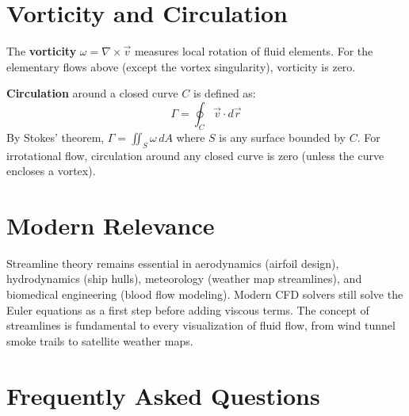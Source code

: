 \section{Vorticity and Circulation}

The \textbf{vorticity} $\omega = \nabla \times \vec{v}$ measures local rotation of fluid elements.
For the elementary flows above (except the vortex singularity), vorticity is zero.

\textbf{Circulation} around a closed curve $C$ is defined as:
\[
\Gamma = \oint_C \vec{v} \cdot d\vec{r}
\]
By Stokes' theorem, $\Gamma = \iint_S \omega \, dA$ where $S$ is any surface bounded by $C$.
For irrotational flow, circulation around any closed curve is zero (unless the curve encloses a vortex).

\section{Modern Relevance}

Streamline theory remains essential in aerodynamics (airfoil design), hydrodynamics (ship hulls),
meteorology (weather map streamlines), and biomedical engineering (blood flow modeling).
Modern CFD solvers still solve the Euler equations as a first step before adding viscous terms.
The concept of streamlines is fundamental to every visualization of fluid flow, from wind tunnel
smoke trails to satellite weather maps.

\section{Frequently Asked Questions}

